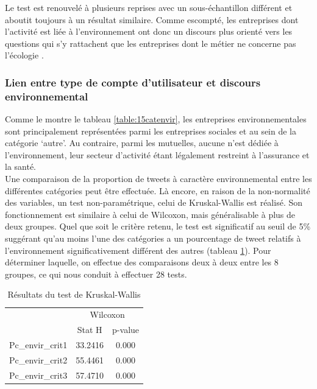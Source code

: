         Le test est renouvelé à plusieurs reprises avec un sous-échantillon différent et aboutit toujours à un résultat similaire. Comme escompté, les entreprises dont l’activité est liée à l’environnement ont donc un discours plus orienté vers les questions qui s’y rattachent que les entreprises dont le métier ne concerne pas l’écologie .



        \subsubsection{Lien entre type de compte d’utilisateur et discours environnemental}
        Comme le montre le tableau \ref{table:15catenvir}, les entreprises environnementales sont principalement représentées parmi les entreprises sociales et au sein de la catégorie ‘autre’. Au contraire, parmi les mutuelles, aucune n’est dédiée à l’environnement, leur secteur d’activité étant légalement restreint à l’assurance et la santé. \\

        Une comparaison de la proportion de tweets à caractère environnemental entre les différentes catégories peut être effectuée. Là encore, en raison de la non-normalité des variables, un test non-paramétrique, celui de Kruskal-Wallis est réalisé. Son fonctionnement est similaire à celui de Wilcoxon, mais généralisable à plus de deux groupes. Quel que soit le critère retenu, le test est significatif au seuil de 5\% suggérant qu’au moins l’une des catégories a un pourcentage de tweet relatifs à l’environnement significativement différent des autres (tableau \ref{table:17KW}). Pour déterminer laquelle, on effectue des comparaisons deux à deux entre les 8 groupes, ce qui nous conduit à effectuer 28 tests. \\


        \begin{table}
        \centering
        \caption{Résultats du test de Kruskal-Wallis}
        \label{table:17KW}
            \begin{tabular}{|l|c|c|}
            \hline
            &\multicolumn{2}{|c|}{Wilcoxon} \\ \cline{2-3}
            & Stat H & p-value \\ \hline
            Pc\_envir\_crit1	& 33.2416	& 0.000\\ \hline
            Pc\_envir\_crit2	& 55.4461	& 0.000\\ \hline
            Pc\_envir\_crit3	& 57.4710	& 0.000\\ \hline

            \end{tabular}
        \end{table}



